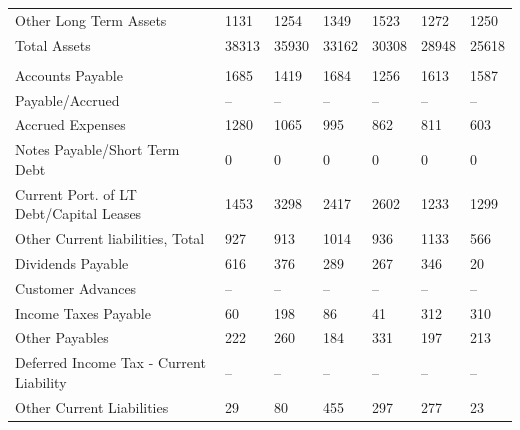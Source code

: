 \documentclass[grad,numbers]{coppe}
\begin{document}
\begin{longtable}[t]{lllllll}
  \hspace{1em}\hspace{1em}Other Long Term Assets & 1131 & 1254 & 1349 & 1523 & 1272 & 1250\\
  \hspace{1em}Total Assets & 38313 & 35930 & 33162 & 30308 & 28948 & 25618\\
  \addlinespace[0.3em]
  \multicolumn{7}{l}{\textbf{Liabilities}}\\
  \hspace{1em}Accounts Payable & 1685 & 1419 & 1684 & 1256 & 1613 & 1587\\
  \hspace{1em}Payable/Accrued & -- & -- & -- & -- & -- & --\\
  \hspace{1em}Accrued Expenses & 1280 & 1065 & 995 & 862 & 811 & 603\\
  \hspace{1em}Notes Payable/Short Term Debt & 0 & 0 & 0 & 0 & 0 & 0\\
  \hspace{1em}Current Port. of LT Debt/Capital Leases & 1453 & 3298 & 2417 & 2602 & 1233 & 1299\\
  \hspace{1em}Other Current liabilities, Total & 927 & 913 & 1014 & 936 & 1133 & 566\\
  \hspace{1em}\hspace{1em}Dividends Payable & 616 & 376 & 289 & 267 & 346 & 20\\
  \hspace{1em}\hspace{1em}Customer Advances & -- & -- & -- & -- & -- & --\\
  \hspace{1em}\hspace{1em}Income Taxes Payable & 60 & 198 & 86 & 41 & 312 & 310\\
  \hspace{1em}\hspace{1em}Other Payables & 222 & 260 & 184 & 331 & 197 & 213\\
  \hspace{1em}\hspace{1em}Deferred Income Tax - Current Liability & -- & -- & -- & -- & -- & --\\
  \hspace{1em}\hspace{1em}Other Current Liabilities & 29 & 80 & 455 & 297 & 277 & 23\\

\end{longtable}
\end{document}
